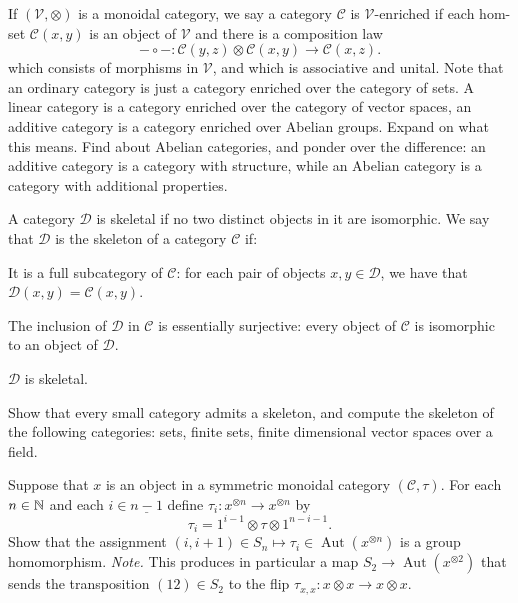 \begin{question}
If $(\mathcal{V},\otimes)$ is a monoidal category, we say a category $\mathcal{C}$ 
is $\mathcal V$-enriched if each hom-set 
$\mathcal{C}(x,y)$ is an object of $\mathcal{V}$ and
there is a composition law 
\[-\circ -: \mathcal C(y,z) \otimes  \mathcal C(x,y) 
	\longrightarrow \mathcal C(x,z). \] 
which consists of morphisms in $\mathcal{V}$, and which is 
associative and unital. Note that an ordinary category is
just a category enriched over the category of sets.
A linear category is a category enriched over the
category of vector spaces, an additive category is a
category enriched over Abelian groups.
Expand on what this means. Find about Abelian
categories, and ponder over the difference: an additive
category is a category with structure, while an
Abelian category is a category with additional properties.
\end{question}

\begin{question}\label{ex:skeleton}
A category $\mathcal D$ is skeletal if no two distinct
objects in it are isomorphic. We say that $\mathcal{D}$ is
the skeleton of a category $\mathcal{C}$ if:
\begin{tenumerate}
\item It is a full subcategory of $\mathcal{C}$: for each
pair of objects $x,y\in\mathcal{D}$, we have that $\mathcal{D}(x,y) = \mathcal{C}(x,y)$.
\item The inclusion of $\mathcal{D}$ in $\mathcal{C}$ is
essentially surjective: every object of $\mathcal{C}$ is
isomorphic to an object of $\mathcal{D}$.
\item $\mathcal{D}$ is skeletal.
\end{tenumerate}
Show that every small category admits a skeleton, and
compute the skeleton of the following categories: sets,
finite sets, finite dimensional vector spaces over
a field.
\end{question}
\medskip

\begin{question}
Suppose that $x$ is an object in a symmetric monoidal
category $(\mathcal{C},\tau)$. For each $n\in\mathbb N$ and 
each $i\in \underline{n-1}$ define $\tau_i : x^{\otimes n} 
\longrightarrow x^{\otimes n}$ by
\[ \tau_i = 1^{i-1} \otimes \tau \otimes 1^{n-i-1}.\]
Show that the assignment
$(i,i+1)\in S_n\longmapsto \tau_i
	 \in\operatorname{Aut}( x^{\otimes n})$ 
	 is a group homomorphism. \emph{Note.} This
	 produces in particular a map $S_2\longrightarrow 
	 \operatorname{Aut}(x^{\otimes 2})$ that sends
	 the transposition $(12)\in S_2$ to the
	 flip $\tau_{x,x}:x\otimes x\longrightarrow 
	 x\otimes x$.  
\end{question}

